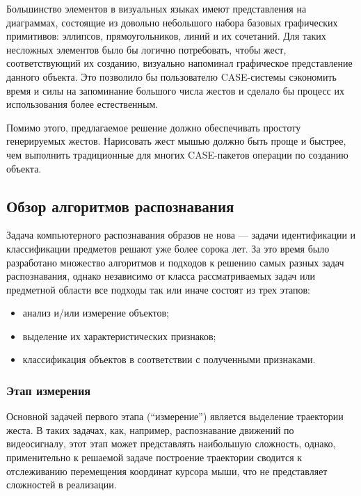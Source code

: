 \documentclass[a5paper]{article}
\begin{document}
Большинство элементов в визуальных языках имеют представления на диаграммах, состоящие из довольно небольшого набора базовых графических 
примитивов: эллипсов, прямоугольников, линий и их сочетаний. Для таких несложных элементов было бы логично потребовать, чтобы жест, 
соответствующий их созданию, визуально напоминал графическое представление данного объекта. Это позволило бы пользователю CASE-системы 
сэкономить время и силы на запоминание большого числа жестов и сделало бы процесс их использования более естественным. 

Помимо этого, предлагаемое решение должно обеспечивать простоту генерируемых жестов. Нарисовать жест мышью должно быть проще и быстрее, 
чем выполнить традиционные для многих CASE-пакетов операции по созданию объекта. 

\subsection{Обзор алгоритмов распознавания}
Задача компьютерного распознавания образов не нова --- задачи идентификации и классификации предметов решают уже более сорока лет. За это 
время было разработано множество алгоритмов и подходов к решению самых разных задач распознавания, однако независимо от класса 
рассматриваемых задач или предметной области все подходы так или иначе состоят из трех этапов: 
\begin{itemize}
  \item анализ и/или измерение объектов;
  \item выделение их характеристических признаков;
  \item классификация объектов в соответствии с полученными признаками.
\end{itemize}

\subsubsection{Этап измерения}
Основной задачей первого этапа (``измерение'') является выделение траектории жеста. В таких задачах, как, например, распознавание движений по видеосигналу, этот этап может представлять наибольшую сложность, однако, применительно к решаемой задаче построение траектории сводится к отслеживанию перемещения координат курсора мыши, что не представляет сложностей в реализации. 
\end{document}

